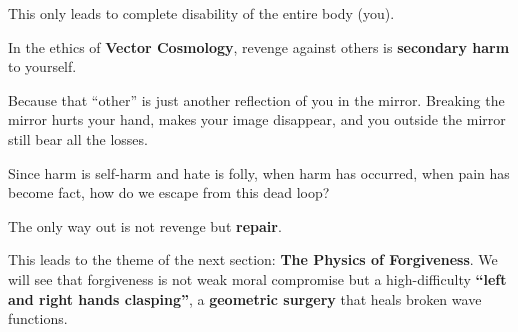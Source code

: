 This only leads to complete disability of the entire body (you).

In the ethics of \textbf{Vector Cosmology}, revenge against others is \textbf{secondary harm} to yourself.

Because that ``other'' is just another reflection of you in the mirror. Breaking the mirror hurts your hand, makes your image disappear, and you outside the mirror still bear all the losses.

Since harm is self-harm and hate is folly, when harm has occurred, when pain has become fact, how do we escape from this dead loop?

The only way out is not revenge but \textbf{repair}.

This leads to the theme of the next section: \textbf{The Physics of Forgiveness}. We will see that forgiveness is not weak moral compromise but a high-difficulty \textbf{``left and right hands clasping''}, a \textbf{geometric surgery} that heals broken wave functions.


